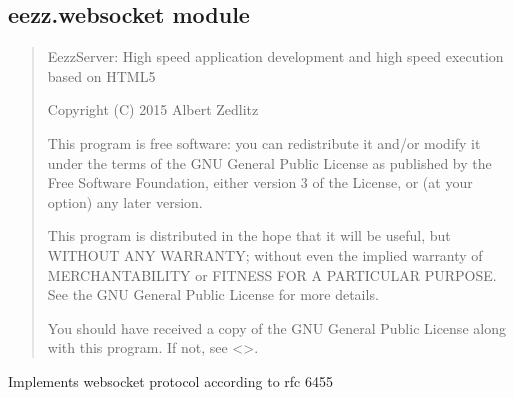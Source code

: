 \documentclass[letterpaper,10pt,english]{sphinxmanual}
\begin{document}
\subsection{eezz.websocket module}
\label{\detokenize{eezz:module-eezz.websocket}}\label{\detokenize{eezz:eezz-websocket-module}}\begin{quote}

\sphinxAtStartPar
EezzServer:
High speed application development and
high speed execution based on HTML5

\sphinxAtStartPar
Copyright (C) 2015  Albert Zedlitz

\sphinxAtStartPar
This program is free software: you can redistribute it and/or modify
it under the terms of the GNU General Public License as published by
the Free Software Foundation, either version 3 of the License, or
(at your option) any later version.

\sphinxAtStartPar
This program is distributed in the hope that it will be useful,
but WITHOUT ANY WARRANTY; without even the implied warranty of
MERCHANTABILITY or FITNESS FOR A PARTICULAR PURPOSE.  See the
GNU General Public License for more details.

\sphinxAtStartPar
You should have received a copy of the GNU General Public License
along with this program.  If not, see <>.
\end{quote}
\begin{description}
\sphinxAtStartPar
Implements websocket protocol according to rfc 6455

\end{description}
\end{document}
